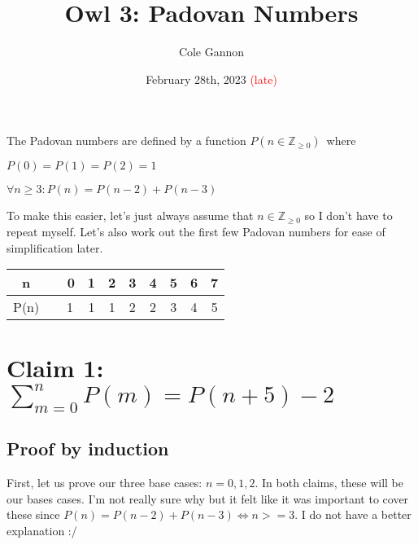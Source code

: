\documentclass[11pt]{article}
\title{Owl 3: Padovan Numbers}
\author{Cole Gannon}
\date{February 28th, 2023 \textcolor{red}{(late)}}
\def \nonneg {\mathbb{Z}_{\geq 0}}
\def \lf {\newline}
\begin{document}
\maketitle
The Padovan numbers are defined by a function ${P(n \in \nonneg)}$\ where\lf

$P(0)=P(1)=P(2)=1$\lf

$\forall n \geq 3:P(n)=P(n-2)+P(n-3)$\lf

To make this easier, let's just always assume that $n\in\nonneg$ so I don't have to repeat myself.
Let's also work out the first few Padovan numbers for ease of simplification later.  \lf

\begin{tabular}{||c c c c c c c c c||}
   \hline n   &\vline\ \ 0 & 1 & 2 & 3 & 4 & 5 & 6 & 7 \\
   \hline P(n)&\vline\ \ 1 & 1 & 1 & 2 & 2 & 3 & 4 & 5 \\
   \hline
  \end{tabular}

\section*{Claim 1: $\displaystyle\sum_{m=0}^{n} P(m) = P(n+5)-2$}

\subsection*{Proof by induction}

First, let us prove our three base cases: $n=0,1,2$.
In both claims, these will be our bases cases. I'm not really sure why but it felt like it was important to cover these since $P(n)=P(n-2)+P(n-3) \iff n>=3$. I do not have a better explanation :/
\end{document}
